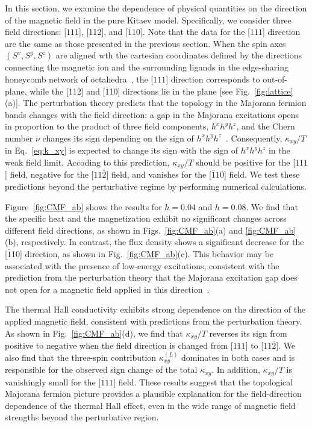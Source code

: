 \documentclass[twocolumn,superscriptaddress,showpacs, longbibliography, aps, prx]{revtex4-2}
\begin{document}
In this section, we examine the dependence of physical quantities on the direction of the magnetic field in the pure Kitaev model.
Specifically, we consider three field directions:
[$111$], [11$\bar{2}$], and [$\bar{1}$10]. 
Note that the data for the [$111$] direction are the same as those presented in the previous section. 
When the spin axes $(S^x, S^y, S^z)$ are aligned wth the cartesian coordinates defined by the directions connecting the magnetic ion and the surrounding ligands in the edge-sharing honeycomb network of octahedra~\cite{Jackeli_PRL2009},  the [$111$] direction corresponds to out-of-plane, while the [11$\bar{2}$] and [$\bar{1}$10] directions lie in the plane [see Fig.~\ref{fig:lattice}(a)]. 
The perturbation theory predicts that the topology in the Majorana fermion bands changes with the field direction: a gap in the Majorana excitations opens in proportion to the product of three field components, $h^x h^y h^z$, and the Chern number $\nu$ changes its sign depending on the sign of $h^x h^y h^z$~\cite{Kitaev2006}. 
Consequently, $\kappa_{xy}/T$ in Eq.~\eqref{eq:k_xy} is expected to change its sign with the sign of $h^x h^y h^z$ in the weak field limit. 
Accoding to this prediction, $\kappa_{xy}/T$ should be positive for the [$111$] field, negative for the [$11\bar{2}]$ field, and vanishes for the [$\bar{1}10$] field.
We test these predictions beyond the perturbative regime by performing numerical calculations.

Figure~\ref{fig:CMF_ab} shows the results for  $h=0.04$ and $h=0.08$. 
We find that the specific heat and the magnetization exhibit no significant changes across different field directions, as shown in Figs.~\ref{fig:CMF_ab}(a) and \ref{fig:CMF_ab}(b), respectively. 
In contrast, the flux density shows a significant decrease for the [$\bar{1}$10] direction, as shown in Fig.~\ref{fig:CMF_ab}(c). 
This behavior may be associated with the presence of low-energy excitations, consistent with the prediction from the perturbation theory that the Majorana excitation gap does not open for a magnetic field applied in this direction~\cite{Kitaev2006}.

The thermal Hall conductivity exhibits strong dependence on the direction of the applied magnetic field, consistent with predictions from the perturbation theory.
As shown in Fig.~\ref{fig:CMF_ab}(d), we find that $\kappa_{xy}/T$ reverses its sign from positive to negative when the field direction is changed from [$111$] to  [$11\bar{2}$]. 
We also find that the three-spin contribution $\kappa_{xy}^{(L)}$ dominates in both cases and is responsible for the observed sign change of the total $\kappa_{xy}$.
In addition, $\kappa_{xy}/T$ is vanishingly small for the [$\bar{1}11$] field. 
These results suggest that the topological Majorana fermion picture provides a plausible explanation for the field-direction dependence of the thermal Hall effect, even in the wide range of magnetic field strengths beyond the perturbative region. 
\end{document}
